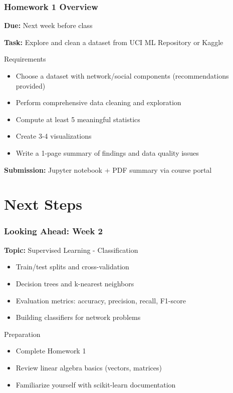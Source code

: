 \documentclass[aspectratio=169]{beamer}
\begin{document}
\begin{frame}
\frametitle{Homework 1 Overview}
\textbf{Due:} Next week before class

\textbf{Task:} Explore and clean a dataset from UCI ML Repository or Kaggle

\begin{block}{Requirements}
\begin{itemize}
    \item Choose a dataset with network/social components (recommendations provided)
    \item Perform comprehensive data cleaning and exploration
    \item Compute at least 5 meaningful statistics
    \item Create 3-4 visualizations
    \item Write a 1-page summary of findings and data quality issues
\end{itemize}
\end{block}

\textbf{Submission:} Jupyter notebook + PDF summary via course portal
\end{frame}

\section{Next Steps}

\begin{frame}
\frametitle{Looking Ahead: Week 2}
\textbf{Topic:} Supervised Learning - Classification

\begin{itemize}
    \item Train/test splits and cross-validation
    \item Decision trees and k-nearest neighbors
    \item Evaluation metrics: accuracy, precision, recall, F1-score
    \item Building classifiers for network problems
\end{itemize}

\vspace{1em}
\begin{block}{Preparation}
\begin{itemize}
    \item Complete Homework 1
    \item Review linear algebra basics (vectors, matrices)
    \item Familiarize yourself with scikit-learn documentation
\end{itemize}
\end{block}
\end{frame}
\end{document}
